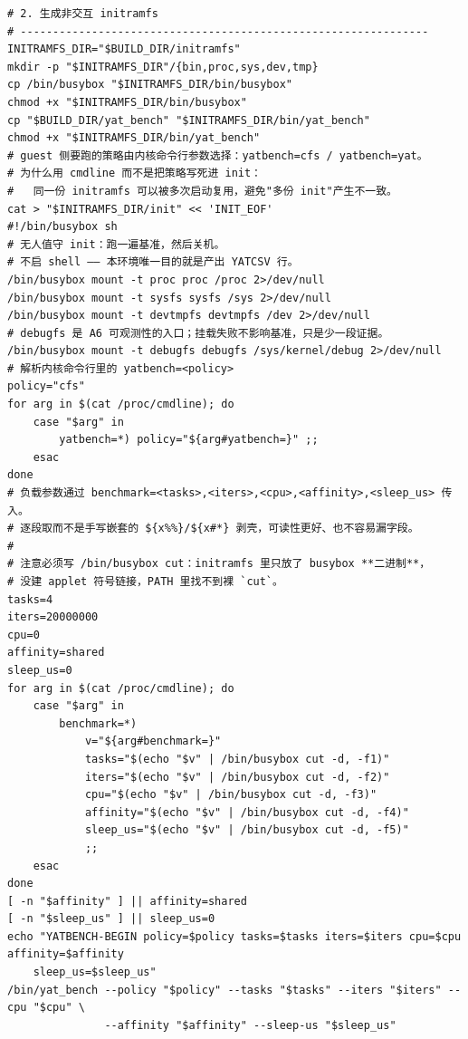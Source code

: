 \documentclass[10pt,a4paper]{article}
\newenvironment{yatpage}{\vspace*{0pt}}{\par}
\begin{document}
\newpage
\begin{yatpage}
\begin{Verbatim}[fontsize=\fontsize{8.2}{9.8}\selectfont]
# 2. 生成非交互 initramfs
# ---------------------------------------------------------------
INITRAMFS_DIR="$BUILD_DIR/initramfs"
mkdir -p "$INITRAMFS_DIR"/{bin,proc,sys,dev,tmp}
cp /bin/busybox "$INITRAMFS_DIR/bin/busybox"
chmod +x "$INITRAMFS_DIR/bin/busybox"
cp "$BUILD_DIR/yat_bench" "$INITRAMFS_DIR/bin/yat_bench"
chmod +x "$INITRAMFS_DIR/bin/yat_bench"
# guest 侧要跑的策略由内核命令行参数选择：yatbench=cfs / yatbench=yat。
# 为什么用 cmdline 而不是把策略写死进 init：
#   同一份 initramfs 可以被多次启动复用，避免"多份 init"产生不一致。
cat > "$INITRAMFS_DIR/init" << 'INIT_EOF'
#!/bin/busybox sh
# 无人值守 init：跑一遍基准，然后关机。
# 不启 shell —— 本环境唯一目的就是产出 YATCSV 行。
/bin/busybox mount -t proc proc /proc 2>/dev/null
/bin/busybox mount -t sysfs sysfs /sys 2>/dev/null
/bin/busybox mount -t devtmpfs devtmpfs /dev 2>/dev/null
# debugfs 是 A6 可观测性的入口；挂载失败不影响基准，只是少一段证据。
/bin/busybox mount -t debugfs debugfs /sys/kernel/debug 2>/dev/null
# 解析内核命令行里的 yatbench=<policy>
policy="cfs"
for arg in $(cat /proc/cmdline); do
    case "$arg" in
        yatbench=*) policy="${arg#yatbench=}" ;;
    esac
done
# 负载参数通过 benchmark=<tasks>,<iters>,<cpu>,<affinity>,<sleep_us> 传入。
# 逐段取而不是手写嵌套的 ${x%%}/${x#*} 剥壳，可读性更好、也不容易漏字段。
#
# 注意必须写 /bin/busybox cut：initramfs 里只放了 busybox **二进制**，
# 没建 applet 符号链接，PATH 里找不到裸 `cut`。
tasks=4
iters=20000000
cpu=0
affinity=shared
sleep_us=0
for arg in $(cat /proc/cmdline); do
    case "$arg" in
        benchmark=*)
            v="${arg#benchmark=}"
            tasks="$(echo "$v" | /bin/busybox cut -d, -f1)"
            iters="$(echo "$v" | /bin/busybox cut -d, -f2)"
            cpu="$(echo "$v" | /bin/busybox cut -d, -f3)"
            affinity="$(echo "$v" | /bin/busybox cut -d, -f4)"
            sleep_us="$(echo "$v" | /bin/busybox cut -d, -f5)"
            ;;
    esac
done
[ -n "$affinity" ] || affinity=shared
[ -n "$sleep_us" ] || sleep_us=0
echo "YATBENCH-BEGIN policy=$policy tasks=$tasks iters=$iters cpu=$cpu affinity=$affinity 
    sleep_us=$sleep_us"
/bin/yat_bench --policy "$policy" --tasks "$tasks" --iters "$iters" --cpu "$cpu" \
               --affinity "$affinity" --sleep-us "$sleep_us"
\end{Verbatim}
\end{yatpage}
\newpage
\end{document}
